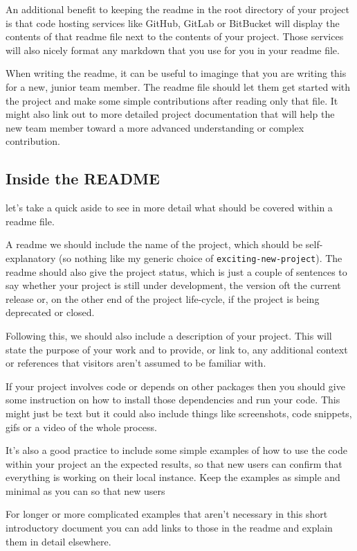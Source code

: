 \documentclass[
  12pt,
]{book}
\begin{document}
An additional benefit to keeping the readme in the root directory of your project is that code hosting services like GitHub, GitLab or BitBucket will display the contents of that readme file next to the contents of your project. Those services will also nicely format any markdown that you use for you in your readme file.

When writing the readme, it can be useful to imaginge that you are writing this for a new, junior team member. The readme file should let them get started with the project and make some simple contributions after reading only that file. It might also link out to more detailed project documentation that will help the new team member toward a more advanced understanding or complex contribution.

\hypertarget{inside-the-readme}{%
\subsection{Inside the README}\label{inside-the-readme}}

let's take a quick aside to see in more detail what should be covered within a readme file.

A readme we should include the name of the project, which should be self-explanatory (so nothing like my generic choice of \texttt{exciting-new-project}). The readme should also give the project status, which is just a couple of sentences to say whether your project is still under development, the version oft the current release or, on the other end of the project life-cycle, if the project is being deprecated or
closed.

Following this, we should also include a description of your project. This will state the purpose of your work and to provide, or link to, any additional context or references that visitors aren't assumed to be familiar with.

If your project involves code or depends on other packages then you should give some instruction on how to install those dependencies and run your code. This might just be text but it could also include things like screenshots, code snippets, gifs or a video of the whole process.

It's also a good practice to include some simple examples of how to use the code within your project an the expected results, so that new users can confirm that everything is working on their local instance. Keep the examples as simple and minimal as you can so that new users

For longer or more complicated examples that aren't necessary in this short introductory document you can add links to those in the readme and explain them
in detail elsewhere.
\end{document}
